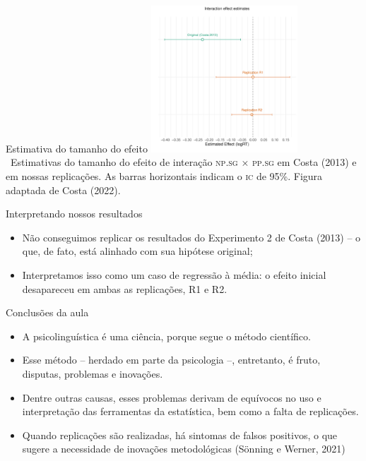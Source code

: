 \documentclass[numbering=fraction,aspectratio=169]{beamer}
\newcommand{\FigureCaption}[1]{{\scriptsize #1}}
\begin{document}
\begin{frame}{Estimativa do tamanho do efeito}
  \centering
  \includegraphics[height=5.5cm]{img/costa2013-effect-size-comparison}\\\
  \FigureCaption{Estimativas do tamanho do efeito de interação \textsc{np.sg} × \textsc{pp.sg} em Costa (2013) e em nossas replicações. As barras horizontais indicam o \textsc{ic} de 95\%. Figura adaptada de Costa (2022).}
\end{frame}

\begin{frame}{Interpretando nossos resultados}
  \begin{itemize}
  \item Não conseguimos replicar os resultados do Experimento 2 de Costa (2013) -- o que, de fato, está alinhado com sua hipótese original;
  \item Interpretamos isso como um caso de \alert{regressão à média}: o efeito inicial desapareceu em ambas as replicações, R1 e R2.
  \end{itemize}
\end{frame}

\begin{frame}{Conclusões da aula}
  \begin{itemize}
  \item \alert<1>{A psicolinguística é uma ciência}, porque segue o método científico.
  \item Esse método -- herdado em parte da psicologia --, entretanto, é fruto, \alert<2>{disputas, problemas e inovações}.
  \item Dentre outras causas, esses problemas derivam de \alert<3>{equívocos no uso e interpretação das ferramentas da estatística, bem como a falta de replicações}.
  \item Quando replicações são realizadas, \alert<4>{há sintomas de falsos positivos}, o que sugere a necessidade de inovações metodológicas (Sönning e Werner, 2021)
  \end{itemize}
\end{frame}
\end{document}
